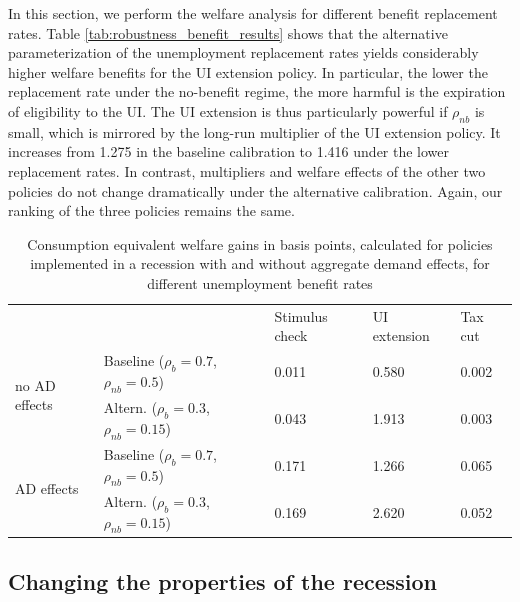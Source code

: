 \documentclass[\econtexRoot/HAFiscal]{subfiles}
\begin{document}
In this section, we perform the welfare analysis for different benefit replacement rates. Table \ref{tab:robustness_benefit_results} shows that the alternative parameterization of the unemployment replacement rates yields considerably higher welfare benefits for the UI extension policy. In particular, the lower the replacement rate under the no-benefit regime, the more harmful is the expiration of eligibility to the UI. The UI extension is thus particularly powerful if $\rho_{nb}$ is small, which is mirrored by the long-run multiplier of the UI extension policy. It increases from 1.275 in the baseline calibration to 1.416 under the lower replacement rates. In contrast, multipliers and welfare effects of the other two policies do not change dramatically under the alternative calibration. Again, our ranking of the three policies remains the same.


\begin{table}[]
  \begin{center}
    \begin{tabular}{@{}lllll@{}}
      \toprule
      &                    & Stimulus check & UI extension & Tax cut \\ \cmidrule(l){1-5} 
      \multirow{2}{*}{no AD effects} 	& Baseline  ($\rho_{b}=0.7$, $\rho_{nb}=0.5$) 		& 0.011          & 0.580        & 0.002   \\
      & Altern.  ($\rho_{b}=0.3$, $\rho_{nb}=0.15$) 	& 0.043          & 1.913        & 0.003   \\ \cmidrule(l){1-5} 
      \multirow{2}{*}{AD effects}		& Baseline  ($\rho_{b}=0.7$, $\rho_{nb}=0.5$)    	& 0.171          & 1.266        & 0.065   \\
      & Altern.  ($\rho_{b}=0.3$, $\rho_{nb}=0.15$)    & 0.169          & 2.620        & 0.052   \\ \cmidrule(l){1-5} 
    \end{tabular}
    \caption{Consumption equivalent welfare gains in basis points, calculated for policies implemented in a recession with and without aggregate demand effects, for different unemployment benefit rates}
    \notinsubfile{\label{tab:robustness_benefit_results}}
  \end{center}
\end{table}




\FloatBarrier
\hypertarget{changing-the-properties-of-the-recession}{}\par\subsection{Changing the properties of the recession}
\end{document}

